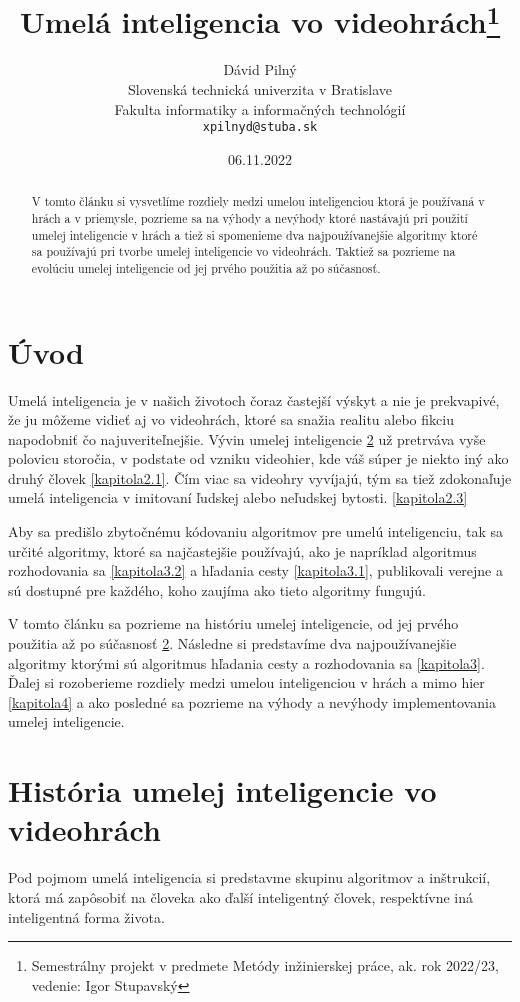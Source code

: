 \documentclass[10pt,oneside,slovak,a4paper]{article}
\title{Umelá inteligencia vo videohrách\thanks{Semestrálny projekt v predmete Metódy inžinierskej práce, ak. rok 2022/23, vedenie: Igor Stupavský}} %
\author{Dávid Pilný\\[2pt]
	{\small Slovenská technická univerzita v Bratislave}\\
	{\small Fakulta informatiky a informačných technológií}\\
	{\small \texttt{xpilnyd@stuba.sk}}
	}
\date{\small 06.11.2022} %
\begin{document}
\maketitle

\begin{abstract}
V tomto článku si vysvetlíme rozdiely medzi umelou inteligenciou ktorá je používaná v hrách a v priemysle, pozrieme sa na výhody a nevýhody ktoré nastávajú pri použití umelej inteligencie v hrách a tiež si spomenieme dva najpoužívanejšie algoritmy ktoré sa používajú pri tvorbe umelej inteligencie vo videohrách. Taktiež sa pozrieme na evolúciu umelej inteligencie od jej prvého použitia až po súčasnosť.
\end{abstract}


\section{Úvod} \label{kapitola1}
Umelá inteligencia je v našich životoch čoraz častejší výskyt a nie je prekvapivé, že ju môžeme vidieť aj vo videohrách, ktoré sa snažia realitu alebo fikciu napodobniť čo najuveriteľnejšie. Vývin umelej inteligencie \ref{kapitola2} už pretrváva vyše polovicu storočia, v podstate od vzniku videohier, kde váš súper je niekto iný ako druhý človek \ref{kapitola2.1}. Čím viac sa videohry vyvíjajú, tým sa tiež zdokonaľuje umelá inteligencia v imitovaní ľudskej alebo neľudskej bytosti. \ref{kapitola2.3}

Aby sa predišlo zbytočnému kódovaniu algoritmov pre umelú inteligenciu, tak sa určité algoritmy, ktoré sa najčastejšie používajú, ako je napríklad algoritmus rozhodovania sa \ref{kapitola3.2} a hľadania cesty \ref{kapitola3.1}, publikovali verejne a sú dostupné pre každého, koho zaujíma ako tieto algoritmy fungujú.

V tomto článku sa pozrieme na históriu umelej inteligencie, od jej prvého použitia až po súčasnosť \ref{kapitola2}. Následne si predstavíme dva najpoužívanejšie algoritmy ktorými sú algoritmus hľadania cesty a rozhodovania sa \ref {kapitola3}. Ďalej si rozoberieme rozdiely medzi umelou inteligenciou v hrách a mimo hier \ref{kapitola4} a ako posledné sa pozrieme na výhody a nevýhody implementovania umelej inteligencie.


\section{História umelej inteligencie vo videohrách} \label{kapitola2}
Pod pojmom umelá inteligencia si predstavme skupinu algoritmov a inštrukcií, ktorá má zapôsobiť na človeka ako ďalší inteligentný človek, respektívne iná inteligentná forma života.
\end{document}
